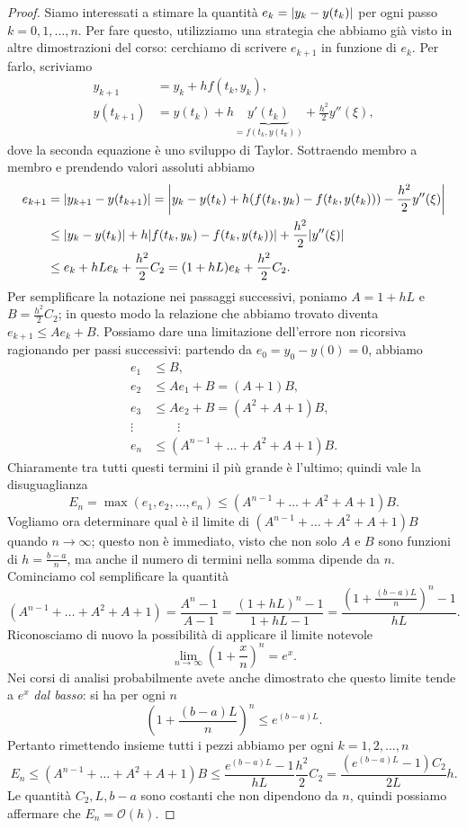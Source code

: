 \documentclass[a4paper]{report}
\DeclarePairedDelimiter{\abs}{\lvert}{\rvert}
\theoremstyle{definition}
\theoremstyle{remark}
\newcommand{\checkkey}[1]{%
        \ifstrequal{#1}{inf}{\setbool{showcontent}{true}}{}%
    }
\newenvironment{conditional}[1][]{%
        \setbool{showcontent}{false}%
        \forcsvlist\checkkey{#1}%
        \ifbool{showcontent}{\begingroup}{\expandafter\comment}%
    }{%
        \ifbool{showcontent}{\endgroup}{\expandafter\endcomment}%
    }
\newcommand{\checkkey}[1]{%
        \ifstrequal{#1}{ich}{\setbool{showcontent}{true}}{}%
    }
\newenvironment{conditional}[1][]{%
        \setbool{showcontent}{false}%
        \forcsvlist\checkkey{#1}%
        \ifbool{showcontent}{\begingroup}{\expandafter\comment}%
    }{%
        \ifbool{showcontent}{\endgroup}{\expandafter\endcomment}%
    }
\begin{document}
\begin{conditional}[ich]
\begin{proof}
Siamo interessati a stimare la quantità $e_k = \abs{y_k - y(t_k)}$ per ogni passo $k=0,1,\dots,n$. Per fare questo, utilizziamo una strategia che abbiamo già visto in altre dimostrazioni del corso: cerchiamo di scrivere $e_{k+1}$ in funzione di $e_k$. Per farlo, scriviamo
\begin{align*}
y_{k+1} &= y_k + h f(t_k, y_k),\\
y(t_{k+1}) &= y(t_k) + h \underbrace{y'(t_k)}_{=f(t_k,y(t_k))} + \frac{h^2}{2} y''(\xi),
\end{align*}
dove la seconda equazione è uno sviluppo di Taylor. Sottraendo membro a membro e prendendo valori assoluti abbiamo
\begin{align*}
    e_{k+1} &= \abs*{y_{k+1} - y(t_{k+1})} = \abs*{y_k - y(t_k) + h(f(t_k,y_k) - f(t_k,y(t_k))) - \frac{h^2}{2} y''(\xi)}\\
            & \leq \abs*{y_k - y(t_k)} + h \abs*{f(t_k,y_k) - f(t_k,y(t_k))} + \frac{h^2}{2} \abs*{y''(\xi)}\\
            & \leq e_k + hL e_k + \frac{h^2}{2}C_2 = (1+hL) e_k + \frac{h^2}{2}C_2.
\end{align*}
Per semplificare la notazione nei passaggi successivi, poniamo $A = 1+hL$ e $B = \frac{h^2}{2}C_2$; in questo modo la relazione che abbiamo trovato diventa $e_{k+1} \leq A e_k + B$. Possiamo dare una limitazione dell'errore non ricorsiva ragionando per passi successivi: partendo da $e_0 = y_0 - y(0) = 0$, abbiamo
\begin{align*}
    e_1 &\leq B,\\
    e_2 &\leq Ae_1 + B = (A + 1)B,\\    
    e_3 &\leq Ae_2 + B = (A^2 + A +1)B,\\
    \vdots & \quad\quad\vdots\\
    e_n &\leq (A^{n-1}+ \dots + A^2 + A + 1)B.
\end{align*}
Chiaramente tra tutti questi termini il più grande è l'ultimo; quindi vale la disuguaglianza
\[
E_n = \max(e_1,e_2,\dots,e_n) \leq (A^{n-1}+ \dots + A^2 + A + 1)B.
\]
Vogliamo ora determinare qual è il limite di $(A^{n-1}+ \dots + A^2 + A + 1)B$ quando $n\to\infty$; questo non è immediato, visto che non solo $A$ e $B$ sono funzioni di $h = \frac{b-a}{n}$, ma anche il numero di termini nella somma dipende da $n$. Cominciamo col semplificare la quantità
\[
    (A^{n-1}+ \dots + A^2 + A + 1) = \frac{A^n-1}{A-1} = \frac{(1+hL)^n-1}{1+hL-1} = \frac{\left(1+\frac{(b-a)L}{n}\right)^n-1}{hL}.
\]
Riconosciamo di nuovo la possibilità di applicare il limite notevole
\[
    \lim_{n\to \infty} \left(1+\frac{x}{n}\right)^n = e^{x}.
\]
Nei corsi di analisi probabilmente avete anche dimostrato che questo limite tende a $e^{x}$ \emph{dal basso}: si ha per ogni $n$
\[
    \left(1+\frac{(b-a)L}{n}\right)^n \leq e^{(b-a)L}.
\]
Pertanto rimettendo insieme tutti i pezzi abbiamo per ogni $k=1,2,\dots,n$
\[
E_n \leq (A^{n-1}+ \dots + A^2 + A + 1)B \leq \frac{e^{(b-a)L}-1}{hL} \frac{h^2}{2}C_2 = \frac{(e^{(b-a)L}-1) C_2}{2L} h.
\]
Le quantità $C_2, L, b-a$ sono costanti che non dipendono da $n$, quindi possiamo affermare che $E_n = \mathcal{O}(h)$.
\end{proof}


\end{conditional}
\end{document}
